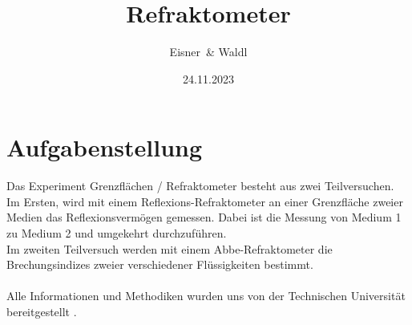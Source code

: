 \documentclass[12pt,a4paper,twoside]{article}
\begin{document}
\newcommand\laboratorynumber{2}
\title{Refraktometer}
\newcommand\supervisor{Ditlbacher, Harald}
\newcommand\groupnumber{42}

\newcommand\participantonelastname{Eisner}
\newcommand\participantonefirstname{Nico}
\newcommand\participantoneid{12214121}
\newcommand\participanttwolastname{Waldl}
\newcommand\participanttwofirstname{Philip}
\newcommand\participanttwoid{12214120}
\author{\participantonelastname \ \& \participanttwolastname}

\newcommand\degreeid{UB 033 678}
\newcommand\semester{23WS}
\date{24.11.2023}

\newcommand\coursetitle{Laborübungen 2: \\ Elektrizität, Magnetismus, Optik}

%



\tableofcontents
\newpage

\section{Aufgabenstellung} %
Das Experiment Grenzflächen / Refraktometer besteht aus zwei Teilversuchen. 
\\
Im Ersten, wird mit einem Reflexions-Refraktometer an einer Grenzfläche zweier Medien das Reflexionsvermögen gemessen. 
Dabei ist die Messung von Medium 1 zu Medium 2 und umgekehrt durchzuführen. 
\\
Im zweiten Teilversuch werden mit einem Abbe-Refraktometer die Brechungsindizes zweier verschiedener Flüssigkeiten bestimmt. 
\\
\\
Alle Informationen und Methodiken wurden uns von der Technischen Universität bereitgestellt \cite{teachcenter2}. 
\end{document}

